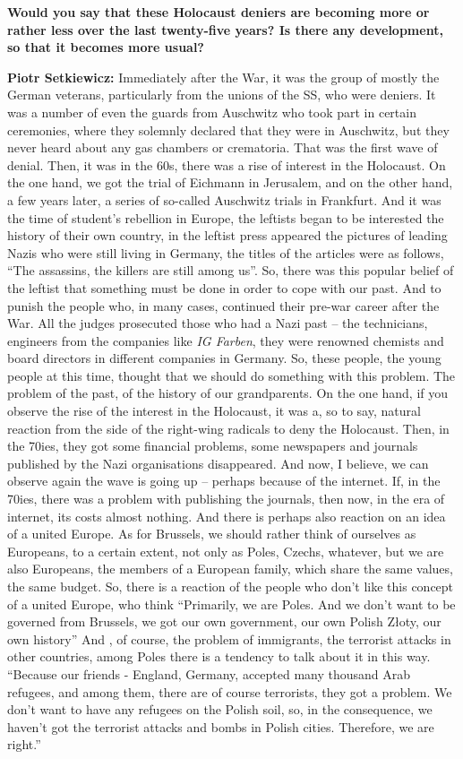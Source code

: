 \textbf{Would you say that these Holocaust deniers are becoming more or rather less over the last twenty-five years? Is there any development, so that it becomes more usual?}

\textbf{Piotr Setkiewicz:} Immediately after the War, it was the group of mostly the German veterans, particularly from the unions of the SS, who were deniers. It was a number of even the guards from Auschwitz who took part in certain ceremonies, where they solemnly declared that they were in Auschwitz, but they never heard about any gas chambers or crematoria. That was the first wave of denial. Then, it was in the 60s, there was a rise of interest in the Holocaust. On the one hand, we got the trial of Eichmann in Jerusalem, and on the other hand, a few years later, a series of so-called Auschwitz trials in Frankfurt. And it was the time of student’s rebellion in Europe, the leftists began to be interested the history of their own country, in the leftist press appeared the pictures of leading Nazis who were still living in Germany, the titles of the articles were as follows, ``The assassins, the killers are still among us''. So, there was this popular belief of the leftist that something must be done in order to cope with our past. And to punish the people who, in many cases, continued their pre-war career after the War. All the judges prosecuted those who had a Nazi past – the technicians, engineers from the companies like \textit{IG Farben}, they were renowned chemists and board directors in different companies in Germany. So, these people, the young people at this time, thought that we should do something with this problem. The problem of the past, of the history of our grandparents. On the one hand, if you observe the rise of the interest in the Holocaust, it was a, so to say, natural reaction from the side of the right-wing radicals to deny the Holocaust. Then, in the 70ies, they got some financial problems, some newspapers and journals published by the Nazi organisations disappeared. And now, I believe, we can observe again the wave is going up – perhaps because of the internet. If, in the 70ies, there was a problem with publishing the journals, then now, in the era of internet, its costs almost nothing. 
And there is perhaps also reaction on an idea of a united Europe. As for Brussels, we should rather think of ourselves as Europeans, to a certain extent, not only as Poles, Czechs, whatever, but we are also Europeans, the members of a European family, which share the same values, the same budget. So, there is a reaction of the people who don’t like this concept of a united Europe, who think ``Primarily, we are Poles. And we don’t want to be governed from Brussels, we got our own government, our own Polish Złoty, our own history'' And , of course, the problem of immigrants, the terrorist attacks in other countries, among Poles there is a tendency to talk about it in this way. ``Because our friends - England, Germany, accepted many thousand Arab refugees, and among them, there are of course terrorists, they got a problem. We don’t want to have any refugees on the Polish soil, so, in the consequence, we haven’t got the terrorist attacks and bombs in Polish cities. Therefore, we are right.''

